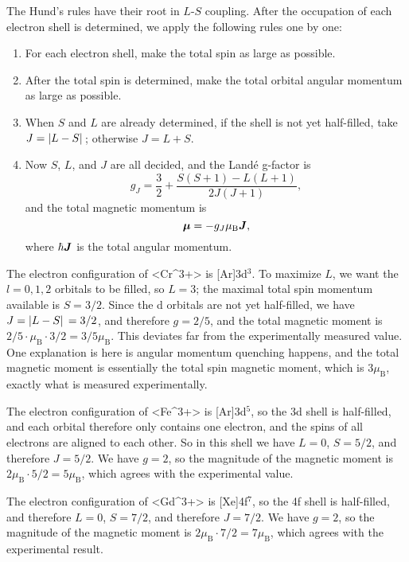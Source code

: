 \documentclass[hyperref, a4paper]{article}
\def\ce#1{<#1>}%
\newcommand*{\muB}{\mu_{\text{B}}}
\begin{document}
The Hund's rules have their root in $L$-$S$ coupling. 
After the occupation of each electron shell is determined, 
we apply the following rules one by one: 
\begin{enumerate}
    \item For each electron shell, 
        make the total spin as large as possible. 
    \item After the total spin is determined, 
        make the total orbital angular momentum as large as possible. 
    \item When $S$ and $L$ are already determined, 
        if the shell is not yet half-filled, 
        take $J = \abs*{L - S}$;
        otherwise $J = L + S$. 
    \item Now $S$, $L$, and $J$ are all decided, 
        and the Landé g-factor is 
        \begin{equation}
            g_J = \frac{3}{2} + \frac{S(S+1) - L(L+1)}{2J(J+1)},
        \end{equation}
        and the total magnetic momentum is 
        \begin{equation}
            \vb*{\mu} = - g_J \muB \vb*{J},
        \end{equation}
        where $\hbar \vb*{J}$ is the total angular momentum.
\end{enumerate}

The electron configuration of \ce{Cr^{3+}} is [Ar]3d$^3$.
To maximize $L$,
we want the $l = 0, 1, 2$ orbitals to be filled,
so $L = 3$;
the maximal total spin momentum available is $S = 3/2$.
Since the d orbitals are not yet half-filled, 
we have $J = \abs*{L - S} = 3/2$,
and therefore $g = 2/5$,
and the total magnetic moment is 
$2/5 \cdot \muB \cdot 3/2 = 3/5 \muB$.
This deviates far from the experimentally measured value.
One explanation is here is angular momentum quenching happens,
and the total magnetic moment is essentially the total spin magnetic moment,
which is $3 \muB$,
exactly what is measured experimentally.

The electron configuration of \ce{Fe^{3+}} is [Ar]3d$^5$,
so the 3d shell is half-filled,
and each orbital therefore only contains one electron,
and the spins of all electrons are aligned to each other.
So in this shell we have $L = 0$, 
$S = 5/2$,
and therefore $J = 5/2$.
We have $g = 2$, 
so the magnitude of the magnetic moment is $2 \muB \cdot 5/2 = 5 \muB$,
which agrees with the experimental value.

The electron configuration of \ce{Gd^{3+}} is [Xe]4f$^7$, 
so the 4f shell is half-filled, 
and therefore $L = 0$, $S = 7/2$,
and therefore $J = 7 / 2$.
We have $g = 2$, so the magnitude of the magnetic moment is $2 \muB \cdot 7 / 2 = 7 \muB$,
which agrees with the experimental result.
\end{document}
